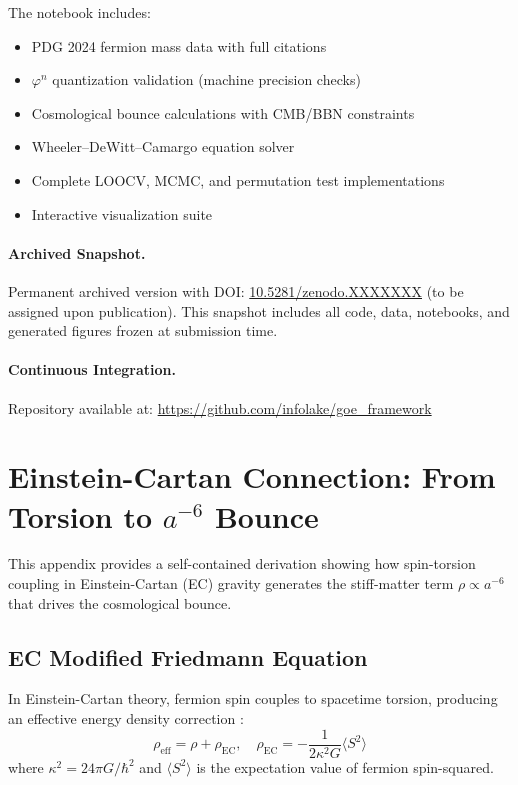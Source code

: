 \documentclass[12pt]{article}
\begin{document}
\noindent The notebook includes:
\begin{itemize}
\item PDG 2024 fermion mass data with full citations
\item $\varphi^n$ quantization validation (machine precision checks)
\item Cosmological bounce calculations with CMB/BBN constraints
\item Wheeler--DeWitt--Camargo equation solver
\item Complete LOOCV, MCMC, and permutation test implementations
\item Interactive visualization suite
\end{itemize}

\paragraph{Archived Snapshot.}
Permanent archived version with DOI: \href{https://doi.org/10.5281/zenodo.XXXXXXX}{10.5281/zenodo.XXXXXXX} (to be assigned upon publication). This snapshot includes all code, data, notebooks, and generated figures frozen at submission time.

\paragraph{Continuous Integration.}
Repository available at: \url{https://github.com/infolake/goe_framework}

\appendix

\section{Einstein-Cartan Connection: From Torsion to $a^{-6}$ Bounce}
\label{app:einstein_cartan}

This appendix provides a self-contained derivation showing how spin-torsion coupling in Einstein-Cartan (EC) gravity generates the stiff-matter term $\rho \propto a^{-6}$ that drives the cosmological bounce.

\subsection{EC Modified Friedmann Equation}

In Einstein-Cartan theory, fermion spin couples to spacetime torsion, producing an effective energy density correction \cite{poplawski2010cosmology}:
\begin{equation}
\rho_{\text{eff}} = \rho + \rho_{\text{EC}}, \quad \rho_{\text{EC}} = -\frac{1}{2\kappa^2 G} \langle S^2 \rangle
\end{equation}
where $\kappa^2 = 24\pi G/\hbar^2$ and $\langle S^2 \rangle$ is the expectation value of fermion spin-squared.
\end{document}
